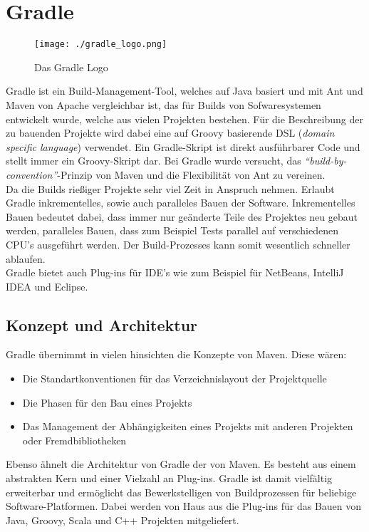 \section{Gradle}
\begin{figure}[h]
	\begin{center}
		\texttt{[image: ./gradle\_logo.png]}
		\caption{Das Gradle Logo}
		\label{fig:gradle_logo}
	\end{center}
\end{figure}
Gradle ist ein Build-Management-Tool, welches auf Java basiert und mit Ant und Maven von Apache vergleichbar ist, das für Builds  von Sofwaresystemen entwickelt wurde, welche aus vielen Projekten bestehen. Für die Beschreibung der zu bauenden Projekte wird dabei eine auf Groovy basierende DSL (\textit{domain specific language}) verwendet. Ein Gradle-Skript ist direkt ausführbarer Code und stellt immer ein Groovy-Skript dar. Bei Gradle wurde versucht, das \textit{\textquotedblleft build-by-convention\textquotedblright}-Prinzip von Maven und die Flexibilität von Ant zu vereinen.
\\
Da die Builds rießiger Projekte sehr viel Zeit in Anspruch nehmen. Erlaubt Gradle inkrementelles, sowie auch paralleles Bauen der Software. Inkrementelles Bauen bedeutet dabei, dass immer nur geänderte Teile des Projektes neu gebaut werden, paralleles Bauen, dass zum Beispiel Tests parallel auf verschiedenen CPU's ausgeführt werden. Der Build-Prozesses kann somit wesentlich schneller ablaufen.
\\
Gradle bietet auch Plug-ins für IDE's wie zum Beispiel für NetBeans, IntelliJ IDEA und Eclipse.
\subsection{Konzept und Architektur}
Gradle übernimmt in vielen hinsichten die Konzepte von Maven. Diese wären:
\begin{itemize}
	\item Die Standartkonventionen für das Verzeichnislayout der Projektquelle
	\item Die Phasen für den Bau eines Projekts
	\item Das Management der Abhängigkeiten eines Projekts mit anderen Projekten oder Fremdbibliotheken
\end{itemize}
Ebenso ähnelt die Architektur von Gradle der von Maven. Es besteht aus einem abstrakten Kern und einer Vielzahl an Plug-ins. Gradle ist damit vielfältig erweiterbar und ermöglicht das Bewerkstelligen von Buildprozessen für beliebige Software-Platformen. Dabei werden von Haus aus die Plug-ins für das Bauen von Java, Groovy, Scala und C++ Projekten mitgeliefert.
